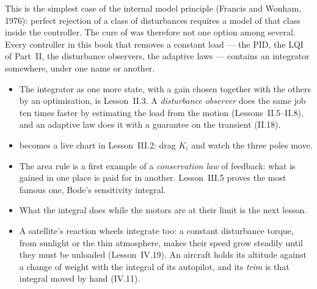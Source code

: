 This is the simplest case of the internal model principle (Francis and Wonham, 1976): perfect rejection of a class of disturbances requires a model of that class inside the controller. The cure of  was therefore not one option among several. Every controller in this book that removes a constant load — the PID, the LQI of Part~II, the disturbance observers, the adaptive laws — contains an integrator somewhere, under one name or another.

\begin{lookahead}
\begin{itemize}[leftmargin=1.2em]
  \item The integrator as one more state, with a gain chosen together with the others by an optimisation, is Lesson~II.3. A \emph{disturbance observer} does the same job ten times faster by estimating the load from the motion (Lessons~II.5–II.8), and an adaptive law does it with a guarantee on the transient (II.18).
  \item {} becomes a live chart in Lesson~III.2: drag $K_i$ and watch the three poles move.
  \item The area rule is a first example of a \emph{conservation law} of feedback: what is gained in one place is paid for in another. Lesson~III.5 proves the most famous one, Bode's sensitivity integral.
  \item What the integral does while the motors are at their limit is the next lesson.
  \item A satellite's reaction wheels integrate too: a constant disturbance torque, from sunlight or the thin atmosphere, makes their speed grow steadily until they must be unloaded (Lesson~IV.19). An aircraft holds its altitude against a change of weight with the integral of its autopilot, and its \emph{trim} is that integral moved by hand (IV.11).
\end{itemize}
\end{lookahead}

